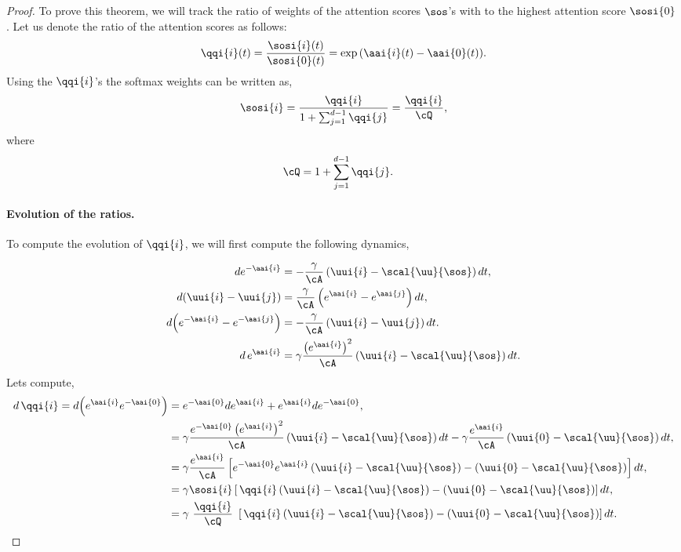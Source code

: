 \documentclass{article}
\theoremstyle{plain}
\theoremstyle{definition}
\theoremstyle{remark}
\begin{document}
\SparsityLogistic*
\begin{proof}
 To prove this theorem, we will track the ratio of weights of the attention scores $\sos$'s with  to the highest attention score $\sosi{0}$ . Let us denote the ratio of the attention scores as follows: 
\begin{align*}
    \qqi{i}(t) = \frac{\sosi{i}(t)}{\sosi{0}(t)} = \exp{\left( \aai{i}(t) - \aai{0}(t) \right)}.    
\end{align*}
Using the $\qqi{i}$'s the softmax weights can be written as,
\begin{align*}
\sosi{i} &= \frac{\qqi{i}}{1 + \sum_{j = 1}^{d-1} \qqi{j}} = \frac{\qqi{i}}{\cQ},  \\
\end{align*}  
where
\begin{align*}
    \cQ &= 1 + \sum_{j = 1}^{d-1} \qqi{j}. 
\end{align*}


\paragraph{Evolution of the ratios.} To compute the evolution of $\qqi{i}$, we will first compute the following dynamics,

\begin{align*}
    d {e^{-\aai{i}}} &= - \frac{\gamma}{\cA} \left( \uui{i} - \scal{\uu}{\sos} \right) d{t}, \\
    d { \left( \uui{i} - \uui{j} \right) } &= \frac{\gamma}{\cA} \left( e^{\aai{i}} - e^{\aai{j}} \right) d{t}, \\
    d { \left( e^{-\aai{i}} - e^{-\aai{j}} \right) } &= - \frac{\gamma}{\cA} \left( \uui{i} - \uui{j} \right) d{t}. \\
    d { \, e^{\aai{i}}} &= \gamma \frac{\left(e^{\aai{i}}\right)^2}{\cA} \left( \uui{i} - \scal{\uu}{\sos} \right) d{t}.
\end{align*}
Lets compute, 
\begin{align*}
    d \, \qqi{i} =  d { \left( e^{ \aai{i}}  e^{-\aai{0}}\right) } &= e^{-\aai{0}} d {e^{\aai{i}}} + e^{\aai{i}} d {e^{-\aai{0}}}, \\     
    &= \gamma \frac{e^{-\aai{0}} \left(e^{\aai{i}}\right)^2}{\cA} \left( \uui{i} - \scal{\uu}{\sos} \right) d{t} - \gamma \frac{e^{\aai{i}}}{\cA} \left( \uui{0} - \scal{\uu}{\sos} \right) d{t}, \\
    &= \gamma \frac{e^{\aai{i}}}{\cA} \left[ e^{-\aai{0}} e^{\aai{i}} \left( \uui{i} - \scal{\uu}{\sos} \right) - \left( \uui{0} - \scal{\uu}{\sos} \right) \right] d{t}, \\
    &= \gamma \sosi{i} \left[ \,  \qqi{i} \left( \uui{i} - \scal{\uu}{\sos} \right) - \left( \uui{0} - \scal{\uu}{\sos} \right) \right] d{t}, \\
    &= \gamma \, \, \frac{\qqi{i}}{\cQ} \, \, \left[ \,  \qqi{i} \left( \uui{i} - \scal{\uu}{\sos} \right) - \left( \uui{0} - \scal{\uu}{\sos} \right) \right] d{t}.
\end{align*}


\end{proof}
\end{document}
